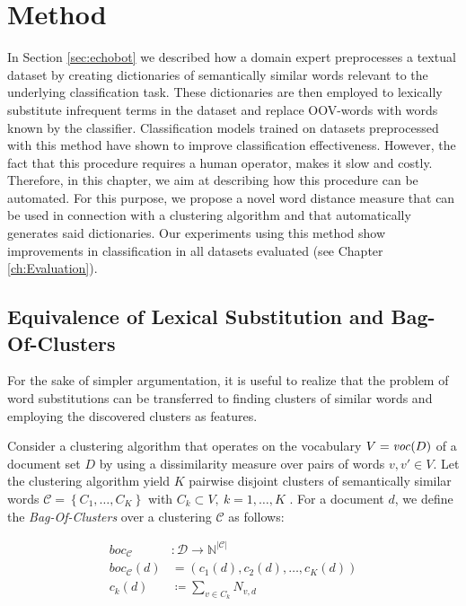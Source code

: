 \chapter{Method}
\label{ch:Method}
In Section \ref{sec:echobot} we described how a domain expert preprocesses a textual
dataset by creating dictionaries of semantically similar words relevant to the
underlying classification task. These dictionaries are then employed to lexically substitute
infrequent terms in the dataset and replace OOV-words with words
known by the classifier. Classification models trained on datasets
preprocessed with this method have shown to improve classification
effectiveness.
However, the fact that this procedure requires a human operator, makes it slow
and costly. Therefore, in this chapter, we aim at describing how this
procedure can be automated.
For this purpose, we propose a novel word distance measure that can be used in
connection with a clustering algorithm and that automatically generates said
dictionaries. Our experiments using this method show
improvements in classification in all datasets evaluated (see Chapter \ref{ch:Evaluation}). 

\section{Equivalence of Lexical Substitution and Bag-Of-Clusters}
\label{sec:lex-sub-boc}
For the sake of simpler argumentation, it is useful to realize that the problem
of word substitutions can be transferred to finding clusters of similar words
and employing the discovered clusters as features. 

Consider a clustering algorithm that operates on the vocabulary $V=\mathit{voc}(D)$
of a document set $D$ by using a dissimilarity measure over pairs of
words $v, v' \in V$. Let the clustering algorithm yield $K$ pairwise disjoint
clusters of semantically similar words $\mathcal{C} = \left\{ C_1, \ldots, C_K
\right\}$ with $C_k \subset V,~k=1,\ldots,K$ .
For a document $d$, we define the \emph{Bag-Of-Clusters} over a clustering $\mathcal{C}$ as follows:

\begin{equation*}
\begin{split}
	 boc_\mathcal{C} &: \mathcal{D} \to \mathbb{N}^{|\mathcal{C}|} \\
	 boc_\mathcal{C}(d) &= (c_1(d),c_2(d),\ldots,c_K(d)) \\
	 c_k(d) &\coloneqq \sum\limits_{v \in C_k} N_{v,d}
\end{split}
\end{equation*}

